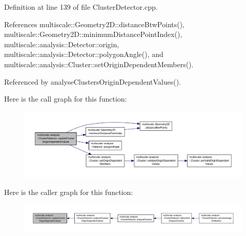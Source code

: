 Definition at line 139 of file Cluster\-Detector.\-cpp.



References multiscale\-::\-Geometry2\-D\-::distance\-Btw\-Points(), multiscale\-::\-Geometry2\-D\-::minimum\-Distance\-Point\-Index(), multiscale\-::analysis\-::\-Detector\-::origin, multiscale\-::analysis\-::\-Detector\-::polygon\-Angle(), and multiscale\-::analysis\-::\-Cluster\-::set\-Origin\-Dependent\-Members().



Referenced by analyse\-Clusters\-Origin\-Dependent\-Values().



Here is the call graph for this function\-:\nopagebreak
\begin{figure}[H]
\begin{center}
\leavevmode
\includegraphics[width=350pt]{classmultiscale_1_1analysis_1_1ClusterDetector_ac7e008a7674205095f94b91c8d7cdccc_cgraph}
\end{center}
\end{figure}




Here is the caller graph for this function\-:\nopagebreak
\begin{figure}[H]
\begin{center}
\leavevmode
\includegraphics[width=350pt]{classmultiscale_1_1analysis_1_1ClusterDetector_ac7e008a7674205095f94b91c8d7cdccc_icgraph}
\end{center}
\end{figure}




